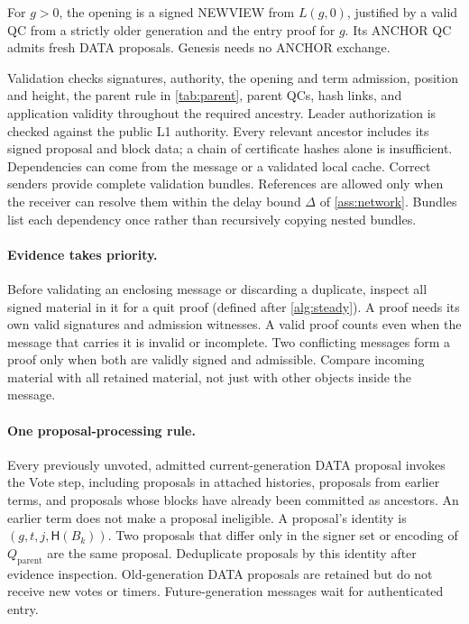 \documentclass[11pt,a4paper]{article}
\newcommand{\Hash}{\mathsf H}
\begin{document}
For $g>0$, the opening is a signed NEWVIEW from $L(g,0)$, justified by
a valid QC from a strictly older generation and the entry proof for
$g$. Its ANCHOR QC admits fresh DATA proposals. Genesis needs no ANCHOR
exchange.

Validation checks signatures, authority, the opening and term admission,
position and height, the parent rule in \cref{tab:parent}, parent QCs,
hash links, and application validity throughout the required ancestry.
Leader authorization is checked against the public L1 authority.
Every relevant ancestor includes its signed proposal and block data;
a chain of certificate hashes alone is insufficient. Dependencies can
come from the message or a validated local cache. Correct senders provide
complete validation bundles. References are allowed only when the receiver
can resolve them within the delay bound $\Delta$ of
\cref{ass:network}. Bundles list each dependency once rather than
recursively copying nested bundles.

\paragraph{Evidence takes priority.}
Before validating an enclosing message or discarding a duplicate,
inspect all signed material in it for a quit proof (defined
after \cref{alg:steady}). A proof needs its own valid signatures and
admission witnesses. A valid proof counts even when the message that
carries it is invalid or incomplete. Two conflicting messages form a proof
only when both are validly signed and admissible.
 Compare incoming
material with all retained material, not just with other
objects inside the message.

\paragraph{One proposal-processing rule.}
Every previously unvoted, admitted current-generation DATA proposal invokes
the Vote step, including proposals in attached histories, proposals from
earlier terms, and proposals whose blocks have already been committed as
ancestors.  An earlier term does not make a proposal
ineligible. A proposal's identity is $(g,t,j,\Hash(B_k))$. Two
proposals that differ only in the signer set or encoding of
$Q_{\mathrm{parent}}$ are the same proposal. Deduplicate proposals
by this identity after evidence inspection. Old-generation DATA proposals
are retained but do not receive new votes or timers. Future-generation
messages wait for authenticated entry.
\end{document}
